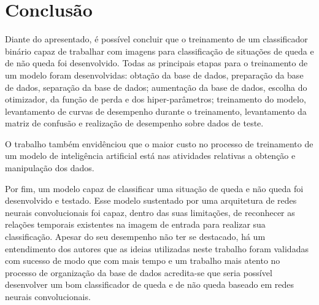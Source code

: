 \documentclass[12pt]{article}
\begin{document}
\section{Conclusão}\label{sec:conc}
Diante do apresentado, é possível concluir que o treinamento de um classificador binário capaz de trabalhar com imagens para classificação de situações de queda e de não queda foi desenvolvido. Todas as principais etapas para o treinamento de um modelo foram desenvolvidas: obtação da base de dados, preparação da base de dados, separação da base de dados; aumentação da base de dados, escolha do otimizador, da função de perda e dos hiper-parâmetros; treinamento do modelo, levantamento de curvas de desempenho durante o treinamento, levantamento da matriz de confusão e realização de desempenho sobre dados de teste.

O trabalho também envidênciou que o maior custo no processo de treinamento de um modelo de inteligência artificial está nas atividades relativas a obtenção e manipulação dos dados.

Por fim, um modelo capaz de classificar uma situação de queda e não queda foi desenvolvido e testado. Esse modelo sustentado por uma arquitetura de redes neurais convolucionais foi capaz, dentro das suas limitações, de reconhecer as relações temporais existentes na imagem de entrada para realizar sua classificação. Apesar do seu desempenho não ter se destacado, há um entendimento dos autores que as ideias utilizadas neste trabalho foram validadas com sucesso de modo que com mais tempo e um trabalho mais atento no processo de organização da base de dados acredita-se que seria possível desenvolver um bom classificador de queda e de não queda baseado em redes neurais convolucionais.



\end{document}
